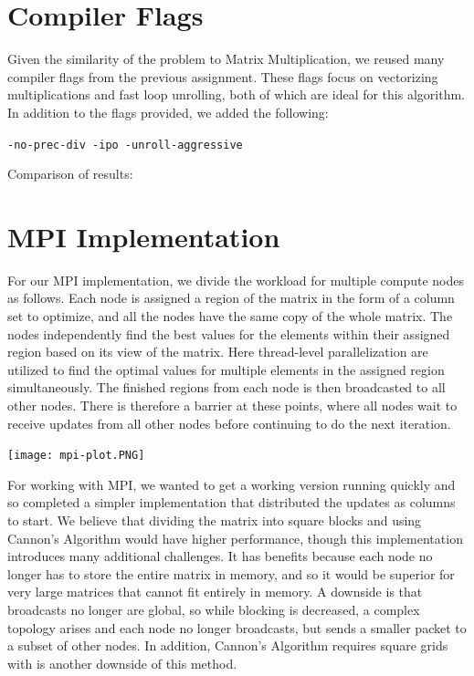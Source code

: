 \documentclass{article}
\begin{document}
\section{Compiler Flags}
Given the similarity of the problem to Matrix Multiplication, we reused many compiler flags from the previous assignment. These flags focus on vectorizing multiplications and fast loop unrolling, both of which are ideal for this algorithm. In addition to the flags provided, we added the following:

\texttt{-no-prec-div -ipo -unroll-aggressive}

Comparison of results:



\section{MPI Implementation}
For our MPI implementation, we divide the workload for multiple compute nodes as follows. Each node is assigned a region of the matrix in the form of a column set to optimize, and all the nodes have the same copy of the whole matrix. The nodes independently find the best values for the elements within their assigned region based on its view of the matrix. Here thread-level parallelization are utilized to find the optimal values for multiple elements in the assigned region simultaneously. The finished regions from each node is then broadcasted to all other nodes. There is therefore a barrier at these points, where all nodes wait to receive updates from all other nodes before continuing to do the next iteration. 

\texttt{[image: mpi-plot.PNG]}

For working with MPI, we wanted to get a working version running quickly and so completed a simpler implementation that distributed the updates as columns to start. We believe that dividing the matrix into square blocks and using Cannon's Algorithm would have higher performance, though this implementation introduces many additional challenges. It has benefits because each node no longer has to store the entire matrix in memory, and so it would be superior for very large matrices that cannot fit entirely in memory. A downside is that broadcasts no longer are global, so while blocking is decreased,  a complex topology arises and each node no longer broadcasts, but sends a smaller packet to a subset of other nodes. In addition, Cannon's Algorithm requires square grids with is another downside of this method.
\end{document}
